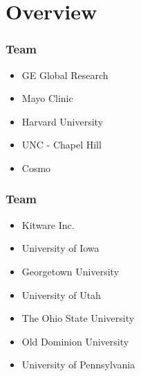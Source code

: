 \section{Overview}







\begin{frame}
\frametitle{Team}
\large
\begin{itemize}
\item GE Global Research
\pause
\item Mayo Clinic
\pause
\item Harvard University
\pause
\item UNC - Chapel Hill
\pause
\item Cosmo
\end{itemize}
\end{frame}

\begin{frame}
\frametitle{Team}
\large
\begin{itemize}
\item Kitware Inc.
\pause
\item University of Iowa
\pause
\item Georgetown University
\pause
\item University of Utah
\pause
\item The Ohio State University
\pause
\item Old Dominion University
\pause
\item University of Pennsylvania
\end{itemize}
\end{frame}







